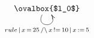 $\xymatrix{
   \ovalbox{$l_0$} \ar@(dl,dr)[]_{rule\,|\,x\,=\,25\,/\backslash\,x\,!=\,10\,|\,x\,:=\,5}
}$
